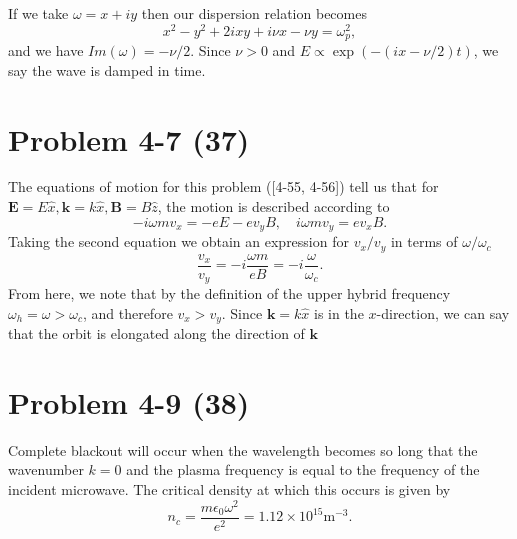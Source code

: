 If we take \(\omega = x + iy \) then our dispersion relation becomes
\begin{equation*}
	x^2 -y^2 + 2ixy + i\nu x - \nu y = \omega_p^2,
\end{equation*}
and we have \(Im(\omega) = -\nu/2\). Since \(\nu > 0 \) and \(E \propto \exp(-(ix-\nu/2)t) \), we say the wave is damped in time. 

\section*{Problem 4-7 (37)}
\label{sec:4-7}
The equations of motion for this problem ([4-55, 4-56]) tell us that for \(\bm{E} = E\hat{x}, \bm{k} = k\hat{x}, \bm{B} = B\hat{z} \), the motion is described according to
\begin{equation*}
	-i\omega m v_x = -eE - ev_yB, \quad i\omega m v_y = ev_xB.
\end{equation*}
Taking the second equation we obtain an expression for \(v_x/v_y\) in terms of \(\omega/\omega_c \)
\begin{equation*}
	\dfrac{v_x}{v_y} = -i\dfrac{\omega m}{eB} = -i\dfrac{\omega}{\omega_c}.
\end{equation*}
From here, we note that by the definition of the upper hybrid frequency \(\omega_h = \omega > \omega_c \), and therefore \(v_x > v_y \). Since \(\bm{k} = k\hat{x}\) is in the \(x\)-direction, we can say that the orbit is elongated along the direction of \(\bm{k}\)



\section*{Problem 4-9 (38)}
\label{sec:4-9}
Complete blackout will occur when the wavelength becomes so long that the wavenumber \(k = 0\) and the plasma frequency is equal to the frequency of the incident microwave. The critical density at which this occurs is given by
\begin{equation*}
	n_c = \dfrac{m\epsilon_0\omega^2}{e^2} = 1.12 \times 10^{15}\text{m}^{-3}.
\end{equation*}


